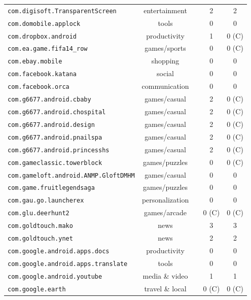 \begin{table*}
\begin{small}
\begin{center}
\begin{tabular}{l|c|c|c|c}
	{\tt com.digisoft.TransparentScreen}		& entertainment 			&\checkmark	& 2 & 2 \\
	{\tt com.domobile.applock}					& tools  					&\checkmark	& 0 & 0   \\
	{\tt com.dropbox.android}						& productivity 			&\checkmark	& 1 & 0 (C) \\
	{\tt com.ea.game.fifa14\_row}					& games/sports 		& 		      		& 0 & 0 (C) \\
	{\tt com.ebay.mobile}							& shopping 				& 					& 0 & 0 \\
	{\tt com.facebook.katana} 						& social 				& \checkmark 	& 0 & 0 \\
	{\tt com.facebook.orca} 						& communication 		& 	     			& 0  & 0 \\
	{\tt com.g6677.android.cbaby}					& games/casual 		& 				& 2    & 0 (C) \\
	{\tt com.g6677.android.chospital}				& games/casual 		& 		      		& 2 & 0 (C) \\
    {\tt com.g6677.android.design}					& games/casual 		& 		      		& 2 & 0 (C) \\
	{\tt com.g6677.android.pnailspa}				& games/casual 		& 		      		& 2 & 0 (C) \\
	{\tt com.g6677.android.princesshs} 				& games/casual 		& 		      		& 2 & 0 (C) \\
	{\tt com.gameclassic.towerblock}				& games/puzzles 		&\checkmark	& 0 & 0 (C) \\
	{\tt com.gameloft.android.ANMP.GloftDMHM}		& games/casual 	&		      		& 0  & 0   \\
	{\tt com.game.fruitlegendsaga}					& games/puzzles 		& 		      		& 0 & 0 \\
	{\tt com.gau.go.launcherex}					& personalization 			& 		      		& 0 & 0 \\
	{\tt com.glu.deerhunt2}						& games/arcade 			& 				& 0 (C) & 0 (C) \\
	{\tt com.goldtouch.mako}						& news 				&\checkmark	& 3 & 3 \\
	{\tt com.goldtouch.ynet} 						& news 				& \checkmark 	& 2 & 2 \\
	{\tt com.google.android.apps.docs}				& productivity 			& 		      		& 0 & 0 \\
	{\tt com.google.android.apps.translate}			& tools 					& 		      		& 0 & 0 \\
	{\tt com.google.android.youtube}				& media \& video		& 		      		& 1 & 1 \\
	{\tt com.google.earth}						& travel \& local 			& 				& 0 (C) & 0 (C) \\

\end{tabular}
\end{center}
\end{small}
\end{table*}
